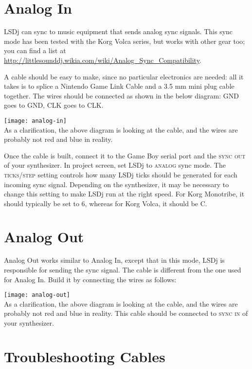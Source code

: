 \section{Analog In}

LSDj can sync to music equipment that sends analog sync signals. This sync mode has been tested with the Korg Volca series, but works with other gear too; you can find a list at \url{http://littlesounddj.wikia.com/wiki/Analog_Sync_Compatibility}.

A cable should be easy to make, since no particular electronics are needed: all it takes is to splice a Nintendo Game Link Cable and a 3.5 mm mini plug cable together. The wires should be connected as shown in the below diagram: GND goes to GND, CLK goes to CLK.

\texttt{[image: analog-in]}\\

As a clarification, the above diagram is looking at the cable, and the wires are probably not red and blue in reality.

Once the cable is built, connect it to the Game Boy serial port and the \textsc{sync out} of your synthesizer. In project screen, set LSDj to \textsc{analog} sync mode. The \textsc{ticks/step} setting controls how many LSDj ticks should be generated for each incoming sync signal. Depending on the synthesizer, it may be necessary to change this setting to make LSDj run at the right speed. For Korg Monotribe, it should typically be set to 6, whereas for Korg Volca, it should be C.

\section{Analog Out}

Analog Out works similar to Analog In, except that in this mode, LSDj is responsible for sending the sync signal. The cable is different from the one used for Analog In. Build it by connecting the wires as follows:

\texttt{[image: analog-out]}\\

As a clarification, the above diagram is looking at the cable, and the wires are probably not red and blue in reality. This cable should be connected to \textsc{sync in} of your synthesizer.

\section{Troubleshooting Cables}

